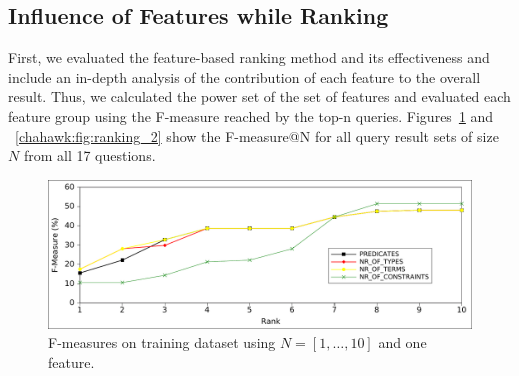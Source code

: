 

\subsection{Influence of Features while Ranking}
First, we evaluated the feature-based ranking method and its effectiveness and include an in-depth analysis of the contribution of each feature to the overall result.
Thus, we calculated the power set of the set of features and evaluated each feature group using the F-measure reached by the top-n queries. 
Figures~\ref{chahawk:fig:ranking_1} and ~\ref{chahawk:fig:ranking_2} show the F-measure@N for all query result sets of size $N$ from all 17 questions. 
\begin{figure}[htb!]
\includegraphics[width=\linewidth]{part_03/ESWC_HAWK/onefeature}
\caption{F-measures on training dataset using $N=[1,\ldots,10]$ and one feature.}
\label{chahawk:fig:ranking_1}
\end{figure}
